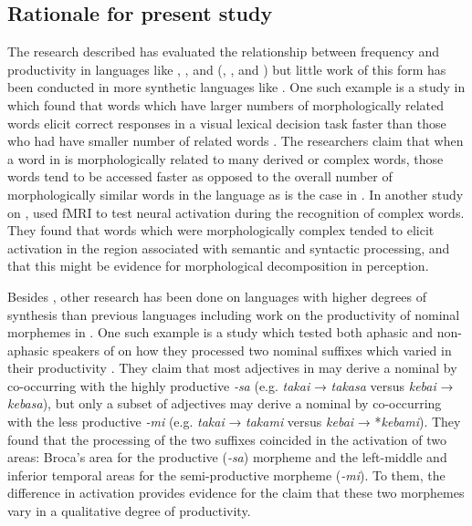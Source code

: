\documentclass[output=paper,modfonts]{langscibook}
\begin{document}
\subsection{Rationale for present study}\label{sec:kloehn:1.5}


The research described has evaluated the relationship between frequency and productivity in languages like , ,  and  (\citealt{Baayen1992}, \citealt{Bybee1997}, and \citealt{HayBaayen2002}) but little work of this form has been conducted in more synthetic languages like . One such example is a study in  which found that words which have larger numbers of morphologically related words elicit correct responses in a visual lexical decision task faster than those who had have smaller number of related words \citep{MoscosoEtAl2004}.  The researchers claim that when a word in  is morphologically related to many derived or complex words, those words tend to be accessed faster as opposed to the overall number of morphologically similar words in the language as is the case in . In another study on , \citet{LehtonenEtAl2006} used fMRI to test neural activation during the recognition of complex words. They found that words which were morphologically complex tended to elicit activation in the region associated with semantic and syntactic processing, and that this might be evidence for morphological decomposition in perception. 

Besides , other research has been done on languages with higher degrees of synthesis than previous languages including work on the productivity of nominal morphemes in . One such example is a study which tested both aphasic and non-aphasic speakers of  on how they processed two nominal suffixes which varied in their productivity \citep{HagiwaraEtAl1999}. They claim that most adjectives in  may derive a nominal by co-occurring with the highly productive \textit{-sa} (e.g.\textit{ takai} → \textit{takasa} versus \textit{kebai} → \textit{kebasa}), but only a subset of adjectives may derive a nominal by co-occurring with the less productive \textit{-mi} (e.g. \textit{takai} → \textit{takami} versus \textit{kebai} → *\textit{kebami}). They found that the processing of the two suffixes coincided in the activation of two areas: Broca’s area for the productive (\textit{-sa}) morpheme and the left-middle and inferior temporal areas for the semi-productive morpheme (\textit{-mi}). To them, the difference in activation provides evidence for the claim that these two morphemes vary in a qualitative degree of productivity. 
\end{document}
